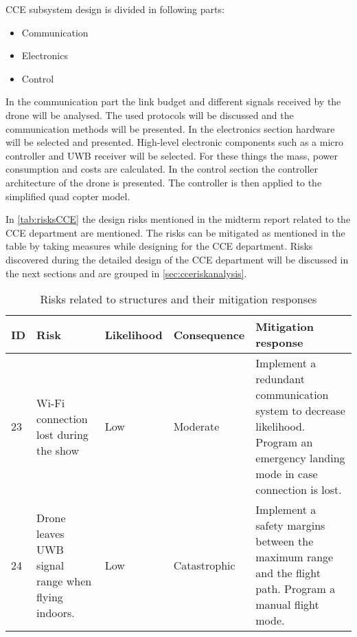 CCE subsystem design is divided in following parts: 
\begin{itemize}[noitemsep,nolistsep]
    \item Communication 
    \item Electronics
    \item Control 
\end{itemize}
In the communication part the link budget and different signals received by the drone will be analysed. The used protocols will be discussed and the communication methods will be presented.
In the electronics section hardware will be selected and presented. High-level electronic components such as a micro controller and UWB receiver will be selected. For these things the mass, power consumption and costs are calculated.  
In the control section the controller architecture of the drone is presented. The controller is then applied to the simplified quad copter model.

In \autoref{tab:risksCCE} the design risks mentioned in the midterm report\cite{midterm} related to the CCE department are mentioned. The risks can be mitigated as mentioned in the table by taking measures while designing for the CCE department. Risks discovered during the detailed design of the CCE department will be discussed in the next sections and are grouped in \autoref{sec:cceriskanalysis}.

\begin{longtable}[c]{|p{}|p{4cm}|p{}|p{}|p{6cm}|}
\caption{Risks related to structures and their mitigation responses}
\label{tab:risksCCE}\\
\hline
\textbf{ID} & \textbf{Risk} & \textbf{Likelihood} & \textbf{Consequence} & \textbf{Mitigation response} \\ \hline
\endfirsthead
%
\endhead
%
23& Wi-Fi connection lost during the show & Low & Moderate & Implement a redundant communication system to decrease likelihood. Program an emergency landing mode in case connection is lost. \\ \hline
24 & Drone leaves UWB signal range when flying indoors. & Low & Catastrophic & Implement a safety margins between the maximum range and the flight path. Program a manual flight mode. \\ \hline



\end{longtable}





